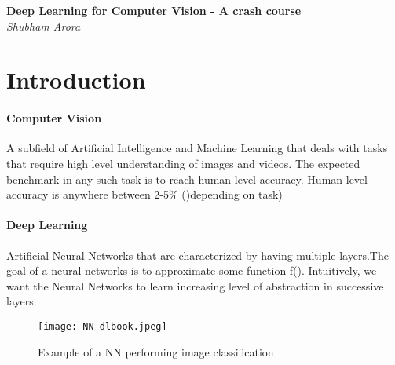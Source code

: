 \documentclass{article}
\begin{document}
	\begin{titlepage}
		\begin{center}
			\Large\textbf{Deep Learning for Computer Vision - A crash course}\\
			\large\textit{Shubham Arora}
		\end{center}
	\end{titlepage}

	\tableofcontents
	\newpage
	
	\section{Introduction}
		\paragraph{Computer Vision}
		A subfield of Artificial Intelligence and Machine Learning that deals with tasks that require high level understanding of images and videos. The expected benchmark in any such task is to reach human level accuracy. Human level accuracy is anywhere between 2-5\% ()depending on task)
		\paragraph{Deep Learning}
		Artificial Neural Networks that are characterized by having multiple layers.The goal of a neural networks is to approximate some function f().
		Intuitively, we want the Neural Networks to learn increasing level of abstraction in successive layers.
		\begin{figure}[H]
			\texttt{[image: NN-dlbook.jpeg]}
			\caption{Example of a NN performing image classification}
			\label{fig:NN-dlbook.jpeg}
		\end{figure}
		
	
\end{document}

